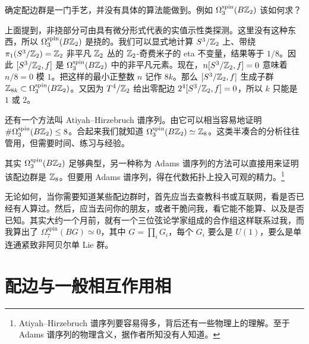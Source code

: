 确定配边群是一门手艺，并没有具体的算法能做到。例如 $\Omega^{\mathrm{spin}}_3(B\mathbb{Z}_2)$ 该如何求？

上面提到，非挠部分可由具有微分形式代表的实值示性类探测。这里没有这种东西，所以 $\Omega^{\mathrm{spin}}_3(B\mathbb{Z}_2)$ 是挠的。我们可以显式地计算 $S^3/\mathbb{Z}_2$ 上、带绕 $\pi_1(S^3/\mathbb{Z}_2)=\mathbb{Z}_2$ 非平凡 $\mathbb{Z}_2$ 丛的 $\mathbb{Z}_2$-奇费米子的 eta 不变量，结果等于 $1/8$。因此 $[S^3/\mathbb{Z}_2,f]$ 是 $\Omega^{\mathrm{spin}}_3(B\mathbb{Z}_2)$ 中的非平凡元素。现在，$n[S^3/\mathbb{Z}_2,f]=0$ 意味着 $n/8=0$ 模 $1$。把这样的最小正整数 $n$ 记作 $8k$。那么 $[S^3/\mathbb{Z}_2,f]$ 生成子群 $\mathbb{Z}_{8k}\subset\Omega^{\mathrm{spin}}_3(B\mathbb{Z}_2)$。又因为 $T^4/\mathbb{Z}_2$ 给出零配边 $2^4[S^3/\mathbb{Z}_2,f]=0$，所以 $k$ 只能是 $1$ 或 $2$。

还有一个方法叫 Atiyah--Hirzebruch 谱序列。由它可以相当容易地证明 $\#\Omega^{\mathrm{spin}}_3(B\mathbb{Z}_2)\le8$。合起来我们就知道 $\Omega^{\mathrm{spin}}_3(B\mathbb{Z}_2)\simeq\mathbb{Z}_8$。这类半凑合的分析往往管用，但需要时间、练习与经验。

其实 $\Omega^{\mathrm{spin}}_3(B\mathbb{Z}_2)$ 足够典型，另一种称为 Adams 谱序列的方法可以直接用来证明该配边群是 $\mathbb{Z}_8$。但要用 Adams 谱序列，得在代数拓扑上投入可观的精力。\footnote{Atiyah--Hirzebruch 谱序列要容易得多，背后还有一些物理上的理解。至于 Adams 谱序列的物理含义，据作者所知没有人知道。}

无论如何，当你需要知道某些配边群时，首先应当去查教科书或互联网，看是否已经有人算过。然后，应当去问你的朋友，或者干脆问我，看它能不能算、以及是否已知。其实大约一个月前，就有一个三位弦论学家组成的合作组这样联系过我，而我算出了 $\Omega^{\mathrm{spin}}_7(BG)\simeq0$，其中 $G=\prod_iG_i$，每个 $G_i$ 要么是 $U(1)$，要么是单连通紧致非阿贝尔单 Lie 群。


\section{配边与一般相互作用相}

